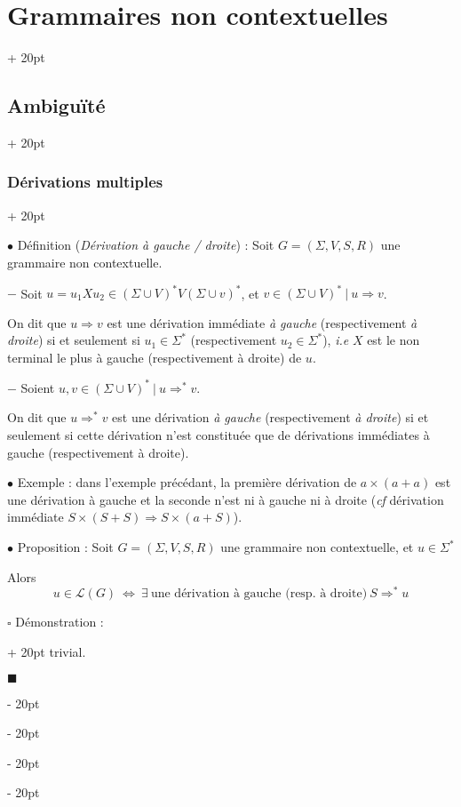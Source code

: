 \documentclass[a4paper, 12pt, twoside]{article}
\newcommand{\lr}[1]{\left( #1 \right)}
\newcommand{\ssi}{\ \Leftrightarrow \ }
\newcommand{\ind}[1][20pt]{\advance\leftskip + #1}
\newcommand{\deind}[1][20pt]{\advance\leftskip - #1}
\newenvironment{indt}[2][20pt]{#2 \par \ind[#1]}{\par \deind} %
\newenvironment{proof}[1][{Démonstration :}]{\begin{indt}{$\square$ #1}}{$\blacksquare$ \end{indt}}
\begin{document}
\begin{indt}{\section{Grammaires non contextuelles}}
\begin{indt}{\subsection{Ambiguïté}}
\begin{indt}{\subsubsection{Dérivations multiples}}
                \vspace{12pt}
                
                $\bullet$ Définition (\textit{Dérivation à gauche / droite}) :
                Soit $G = (\Sigma, V, S, R)$ une grammaire non contextuelle.

                $-$ Soit $u = u_1 X u_2 \in \lr{\Sigma \cup V}^* V \lr{\Sigma \cup v}^*$, et $v \in \lr{\Sigma \cup V}^*\ |\ u \Rightarrow v$.

                On dit que $u \Rightarrow v$ est une dérivation immédiate \emph{à gauche} (respectivement \emph{à droite}) si et seulement si $u_1 \in \Sigma^*$ (respectivement $u_2 \in \Sigma^*$), \textit{i.e} $X$ est le non terminal le plus à gauche (respectivement à droite) de $u$.

                \vspace{6pt}
                
                $-$ Soient $u, v \in \lr{\Sigma \cup V}^*\ |\ u \Rightarrow^* v$.

                On dit que $u \Rightarrow^* v$ est une dérivation \emph{à gauche} (respectivement \emph{à droite}) si et seulement si cette dérivation n'est constituée que de dérivations immédiates à gauche (respectivement à droite).

                \vspace{12pt}
                
                $\bullet$ Exemple : dans l'exemple précédant, la première dérivation de $a \times (a + a)$ est une dérivation à gauche et la seconde n'est ni à gauche ni à droite (\textit{cf} dérivation immédiate $S \times (S + S) \Rightarrow S \times (a + S)$).

                \vspace{12pt}
                
                $\bullet$ Proposition : Soit $G = \lr{\Sigma, V, S, R}$ une grammaire non contextuelle, et $u \in \Sigma^*$

                Alors
                \[
                    u \in \mathcal L(G)
                    \ssi
                    \exists \ \text{une dérivation à gauche (resp. à droite)}\
                    S \Rightarrow^* u
                \]

                \vspace{6pt}
                
                \begin{proof}
                    \boxed{\Leftarrow} trivial.


\end{proof}
\end{indt}
\end{indt}
\end{indt}
\end{document}
